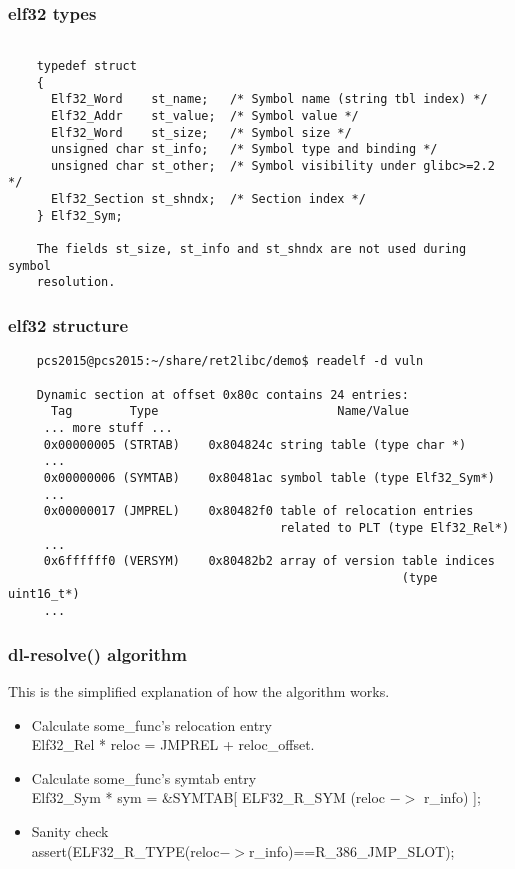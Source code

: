 \documentclass[10pt]{beamer}
\begin{document}
\begin{frame}[fragile]
\frametitle{elf32 types}

	\footnotesize
	\begin{verbatim}

	typedef struct
	{
	  Elf32_Word    st_name;   /* Symbol name (string tbl index) */
	  Elf32_Addr    st_value;  /* Symbol value */
	  Elf32_Word    st_size;   /* Symbol size */
	  unsigned char st_info;   /* Symbol type and binding */
	  unsigned char st_other;  /* Symbol visibility under glibc>=2.2 */
	  Elf32_Section st_shndx;  /* Section index */
	} Elf32_Sym;

	The fields st_size, st_info and st_shndx are not used during symbol
	resolution.
	\end{verbatim}
	\normalsize

\end{frame}

\begin{frame}[fragile]
\frametitle{elf32 structure}

	\scriptsize
	\begin{verbatim}
	pcs2015@pcs2015:~/share/ret2libc/demo$ readelf -d vuln

	Dynamic section at offset 0x80c contains 24 entries:
	  Tag        Type                         Name/Value
	 ... more stuff ...
	 0x00000005 (STRTAB)    0x804824c string table (type char *)
	 ...
	 0x00000006 (SYMTAB)    0x80481ac symbol table (type Elf32_Sym*)
	 ...
	 0x00000017 (JMPREL)    0x80482f0 table of relocation entries
	                                  related to PLT (type Elf32_Rel*)
	 ...
	 0x6ffffff0 (VERSYM)    0x80482b2 array of version table indices
	                                                   (type uint16_t*)
	 ...
	\end{verbatim}
	\normalsize

\end{frame}

\begin{frame}[fragile]
\frametitle{dl-resolve() algorithm}

This is the simplified explanation of how the algorithm works.

 \begin{itemize}
    \item  Calculate some\_func's relocation entry
    \\
    Elf32\_Rel * reloc = JMPREL + reloc\_offset.

    \item Calculate some\_func's symtab entry
    \\
    Elf32\_Sym * sym = \&SYMTAB[ ELF32\_R\_SYM (reloc $->$ r\_info) ];

  	\item Sanity check
  	\\
  	assert(ELF32\_R\_TYPE(reloc$->$r\_info)==R\_386\_JMP\_SLOT);
  \end{itemize}

\end{frame}
\end{document}
